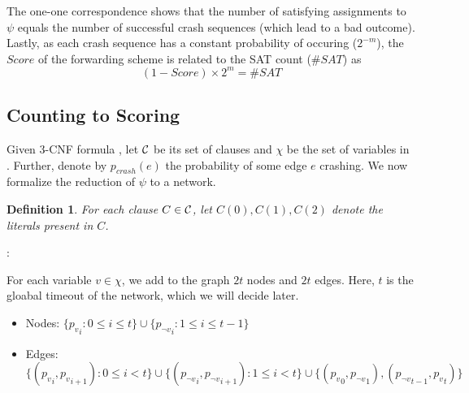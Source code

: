 \documentclass[11pt,eepic]{article}
\newcommand{\set}[1]{\{ #1  \}}
\newcommand{\C}{{\cal C}}
\newtheorem{definition}{Definition}[section]
\begin{document}
	The one-one correspondence shows that the number of satisfying assignments to $\psi$ equals the number of successful crash sequences (which lead to a bad outcome). Lastly, as each crash sequence has a constant probability of occuring ($2^{-m}$), the $Score$ of the forwarding scheme is related to the SAT count ($\#SAT$) as $$(1-Score)\times 2^m = \# SAT$$

	\subsection{Counting to Scoring}

		Given 3-CNF formula \psi, let $\C$ be its set of clauses and $\chi$ be the set of variables in \psi. Further, denote by $p_{crash}(e)$ the probability of some edge $e$ crashing. We now formalize the reduction of $\psi$ to a network.

		\begin{definition} For each clause $C \in \C$, let $C(0), C(1), C(2)$ denote the literals present in $C$.
		\end{definition}

		:

		For each variable $v \in \chi$, we add to the graph $2t$ nodes and $2t$ edges. Here, $t$ is the gloabal timeout of the network, which we will decide later.
		\begin{itemize}
		\item Nodes:  $\set{{p_v}_i : 0 \leq i \leq t} \cup \set{{p_{\neg v}}_i : 1 \leq i \leq t-1}$
		\item Edges:  $\set{({p_v}_i,{p_v}_{i+1}) : 0 \leq i < t} \cup \set{({p_{\neg v}}_i,{p_{\neg v}}_{i+1}) : 1 \leq i < t}  \cup \set{({p_v}_0,{p_{\neg v}}_1),({p_{\neg v}}_{t-1},{p_v}_t)}$
		\end{itemize}


\end{document}
